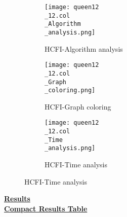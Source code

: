 \documentclass[10pt]{article}
\begin{document}
\graphicspath{{./Core1/Solutions/HCFI/queen12\_12.col}}
\begin{figure}[H]
\begin{subfigure}{.33\textwidth}
  \centering
  \texttt{[image: queen12\\\_12.col\\\_Algorithm\\\_analysis.png]}
  \caption{HCFI-Algorithm analysis}
   \label{fig:subfig1}
\end{subfigure}%
\begin{subfigure}{.33\textwidth}
  \centering
  \texttt{[image: queen12\\\_12.col\\\_Graph\\\_coloring.png]}
  \caption{HCFI-Graph coloring}
  \label{fig:subfig2}
\end{subfigure}
\begin{subfigure}{.33\textwidth}
  \centering
  \texttt{[image: queen12\\\_12.col\\\_Time\\\_analysis.png]}
  \caption{HCFI-Time analysis}
  \end{subfigure}
\end{figure}
\vspace{2cm}
\begin{center}
\hyperlink{page.8}{\textbf{Results}}\\
\vspace{0.5cm}
\hyperlink{page.71}{\textbf{Compact Results Table}}
\end{center}
\pagebreak
\end{document}
